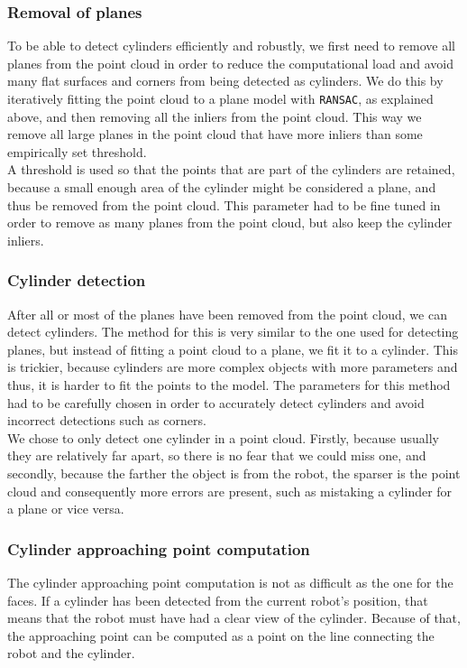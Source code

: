 \documentclass[12pt,a4paper]{article}
\begin{document}
	\subsubsection{Removal of planes}
	To be able to detect cylinders efficiently and robustly, we first need to remove all planes from the point cloud in order to reduce the computational load and avoid many flat surfaces and corners from being detected as cylinders. We do this by iteratively fitting the point cloud to a plane model with \texttt{RANSAC}, as explained above, and then removing all the inliers from the point cloud. This way we remove all large planes in the point cloud that have more inliers than some empirically set threshold. \\
	
	A threshold is used so that the points that are part of the cylinders are retained, because a small enough area of the cylinder might be considered a plane, and thus be removed from the point cloud. This parameter had to be fine tuned in order to remove as many planes from the point cloud, but also keep the cylinder inliers. \\

	\subsubsection{Cylinder detection}
	After all or most of the planes have been removed from the point cloud, we can detect cylinders. The method for this is very similar to the one used for detecting planes, but instead of fitting a point cloud to a plane, we fit it to a cylinder. This is trickier, because cylinders are more complex objects with more parameters and thus, it is harder to fit the points to the model. The parameters for this method had to be carefully chosen in order to accurately detect cylinders and avoid incorrect detections such as corners. \\

	We chose to only detect one cylinder in a point cloud. Firstly, because usually they are relatively far apart, so there is no fear that we could miss one, and secondly, because the farther the object is from the robot, the sparser is the point cloud and consequently more errors are present, such as mistaking a cylinder for a plane or vice versa. \\
	
	\subsubsection{Cylinder approaching point computation}
	The cylinder approaching point computation is not as difficult as the one for the faces. If a cylinder has been detected from the current robot's position, that means that the robot must have had a clear view of the cylinder. Because of that, the approaching point can be computed as a point on the line connecting the robot and the cylinder. \\
	
\end{document}
